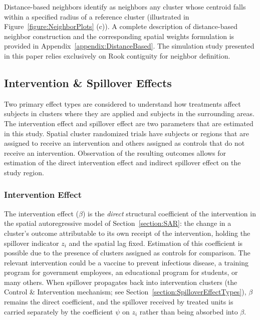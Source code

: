 \documentclass{article}[11pt]
\begin{document}
Distance-based neighbors\cite{fotheringham_sage_2009} identify as neighbors any cluster whose centroid falls within a specified radius of a reference cluster (illustrated in Figure~\ref{figure:NeighborPlots} (c)). A complete description of distance-based neighbor construction and the corresponding spatial weights formulation is provided in Appendix~\ref{appendix:DistanceBased}. The simulation study presented in this paper relies exclusively on Rook contiguity for neighbor definition.

\subsection{Intervention \& Spillover Effects}

Two primary effect types are considered to understand how treatments affect subjects in clusters where they are applied and subjects in the surrounding areas. The intervention effect and spillover effect are two parameters that are estimated in this study. Spatial cluster randomized trials have subjects or regions that are assigned to receive an intervention and others assigned as controls that do not receive an intervention. Observation of the resulting outcomes allows for estimation of the direct intervention effect and indirect spillover effect on the study region.

\subsubsection{Intervention Effect}\label{Section:InterventionEffect}

The intervention effect ($\beta$) is the \textit{direct} structural coefficient of the intervention in the spatial autoregressive model of Section~\ref{section:SAR}: the change in a cluster's outcome attributable to its own receipt of the intervention, holding the spillover indicator $z_i$ and the spatial lag fixed. Estimation of this coefficient is possible due to the presence of clusters assigned as controls for comparison. The relevant intervention could be a vaccine to prevent infectious disease, a training program for government employees, an educational program for students, or many others. When spillover propagates back into intervention clusters (the Control \& Intervention mechanism; see Section~\ref{section:SpilloverEffectTypes}), $\beta$ remains the direct coefficient, and the spillover received by treated units is carried separately by the coefficient $\psi$ on $z_i$ rather than being absorbed into $\beta$.
\end{document}
